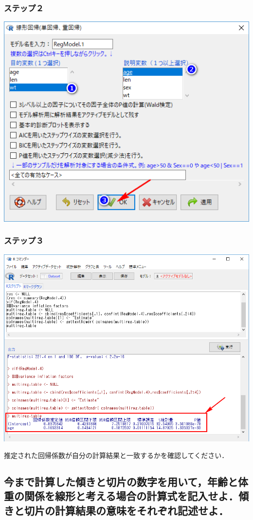 \documentclass[11pt,]{problemset}
\begin{document}
\hypertarget{-6}{%
\subsubsection{ステップ２}\label{-6}}

\begin{center}\includegraphics[width=0.6\linewidth]{pic/lm01} \end{center}

\hypertarget{-7}{%
\subsubsection{ステップ３}\label{-7}}

\begin{center}\includegraphics[width=0.8\linewidth]{pic/lm02} \end{center}

推定された回帰係数が自分の計算結果と一致するかを確認してください．

\subsection{今まで計算した傾きと切片の数字を用いて，年齢と体重の関係を線形と考える場合の計算式を記入せよ．傾きと切片の計算結果の意味をそれぞれ記述せよ．}
\end{document}
